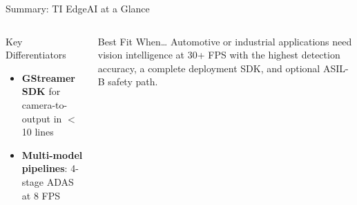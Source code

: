 \documentclass[aspectratio=169]{beamer}
\begin{document}
\begin{frame}{Summary: TI EdgeAI at a Glance}
\begin{columns}
\begin{block}{Key Differentiators}
\begin{itemize}
  \item \textbf{GStreamer SDK} for camera-to-output in $<$10 lines
  \item \textbf{Multi-model pipelines}: 4-stage ADAS at 8 FPS
\end{itemize}
\end{block}
\begin{alertblock}{Best Fit When\ldots}
\footnotesize Automotive or industrial applications need vision intelligence at 30+ FPS with the highest detection accuracy, a complete deployment SDK, and optional ASIL-B safety path.
\end{alertblock}
\end{columns}
\end{frame}
\end{document}
